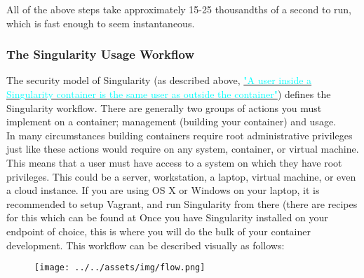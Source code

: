 \documentclass[a4paper]{article}
\begin{document}
All of the above steps take approximately 15-25 thousandths of a second to run, which is fast enough to seem instantaneous.
\subsubsection{The Singularity Usage Workflow}

The security model of Singularity (as described above, \hyperref[sec:securityandpriviledge]{{\textcolor{cyan}{"A user inside a Singularity container is the same user as outside the container"}}}) defines the Singularity workflow. There are generally two groups of actions you must implement on a container; management (building your container) and usage.\\[0.1in]

In many circumstances building containers require root administrative privileges just like these actions would require on any system, container, or virtual machine. This means that a user must have access to a system on which they have root privileges. This could be a server, workstation, a laptop, virtual machine, or even a cloud instance. If you are using OS X or Windows on your laptop, it is recommended to setup Vagrant, and run Singularity from there (there are recipes for this which can be found at  Once you have Singularity installed on your endpoint of choice, this is where you will do the bulk of your container development.
This workflow can be described visually as follows:
\\[0.1in]
\begin{figure}[h]
\centering
\hspace*{-0.62in}
{\texttt{[image: ../../assets/img/flow.png]}}
\end{figure}
\end{document}
